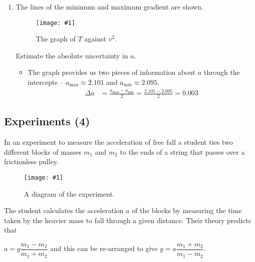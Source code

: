 \documentclass[a4paper,12pt]{article}
\let\oldsubsection\subsection
\renewcommand\subsection{\clearpage\oldsubsection}
\newcommand{\img}[4]{\begin{center}
  \begin{figure}[H]
    \centering
    \texttt{[image: \#1]}
    \caption{#3}
    \label{fig:#4}
  \end{figure}
\end{center}}
\begin{document}
\begin{enumerate}[label=(\alph*)]
\begin{itemize}
        \end{itemize}
  \item The lines of the minimum and maximum gradient are shown.
        \img{ex/11.png}{1}{The graph of $T$ against $v^2$.}{11}
        Estimate the absolute uncertainty in $a$.
        \begin{itemize}
          \item The graph provides us two pieces of information about $a$ through the intercepts -- $a_{\max} \approx 2.101$ and $a_{\min} \approx 2.095$.
                \begin{align*}
                  \Delta a & = \frac{a_{\max} - a_{\min}}{2} = \frac{2.101 - 2.095}{2} = 0.003
                \end{align*}
        \end{itemize}
\end{enumerate}

\subsection{Experiments (4)}

In an experiment to measure the acceleration of free fall a student ties two different blocks of masses $m_1$ and $m_2$ to the ends of a string that passes over a frictionless pulley.

\img{ex/12.png}{0.2}{A diagram of the experiment.}{12}

The student calculates the acceleration \( a \) of the blocks by measuring the time taken by the heavier mass to fall through a given distance. Their theory predicts that

$
  a = g \dfrac{m_1 - m_2}{m_1 + m_2}$ and this can be re-arranged to give $
  g = a \dfrac{m_1 + m_2}{m_1 - m_2}.
$
\end{document}
